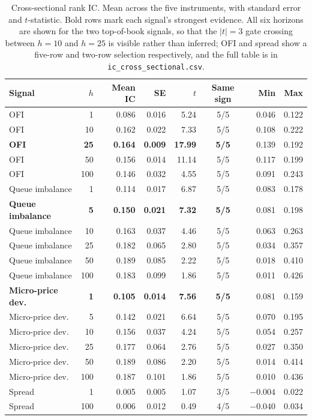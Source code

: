 \documentclass[11pt]{scrartcl}
\begin{document}
\begin{table}[H]
\centering
\caption{Cross-sectional rank IC. Mean across the five instruments, with standard error and $t$-statistic. Bold rows mark each signal's strongest evidence. All six horizons are shown for the two top-of-book signals, so that the $|t| = 3$ gate crossing between $h=10$ and $h=25$ is visible rather than inferred; OFI and spread show a five-row and two-row selection respectively, and the full table is in \texttt{ic\_cross\_sectional.csv}.}
\label{tab:cross}
\begin{tabular}{lrrrrcrr}
\toprule
Signal & $h$ & Mean IC & SE & $t$ & Same sign & Min & Max \\
\midrule
OFI & 1   & 0.086 & 0.016 & 5.24 & 5/5 & 0.046 & 0.122 \\
OFI & 10  & 0.162 & 0.022 & 7.33 & 5/5 & 0.108 & 0.222 \\
\textbf{OFI} & \textbf{25} & \textbf{0.164} & \textbf{0.009} & \textbf{17.99} & \textbf{5/5} & 0.139 & 0.192 \\
OFI & 50  & 0.156 & 0.014 & 11.14 & 5/5 & 0.117 & 0.199 \\
OFI & 100 & 0.146 & 0.032 & 4.55 & 5/5 & 0.091 & 0.243 \\
\midrule
Queue imbalance & 1 & 0.114 & 0.017 & 6.87 & 5/5 & 0.083 & 0.178 \\
\textbf{Queue imbalance} & \textbf{5} & \textbf{0.150} & \textbf{0.021} & \textbf{7.32} & \textbf{5/5} & 0.081 & 0.198 \\
Queue imbalance & 10  & 0.163 & 0.037 & 4.46 & 5/5 & 0.063 & 0.263 \\
Queue imbalance & 25  & 0.182 & 0.065 & 2.80 & 5/5 & 0.034 & 0.357 \\
Queue imbalance & 50  & 0.189 & 0.085 & 2.22 & 5/5 & 0.018 & 0.410 \\
Queue imbalance & 100 & 0.183 & 0.099 & 1.86 & 5/5 & 0.011 & 0.426 \\
\midrule
\textbf{Micro-price dev.} & \textbf{1} & \textbf{0.105} & \textbf{0.014} & \textbf{7.56} & \textbf{5/5} & 0.081 & 0.159 \\
Micro-price dev. & 5   & 0.142 & 0.021 & 6.64 & 5/5 & 0.070 & 0.195 \\
Micro-price dev. & 10  & 0.156 & 0.037 & 4.24 & 5/5 & 0.054 & 0.257 \\
Micro-price dev. & 25  & 0.177 & 0.064 & 2.76 & 5/5 & 0.027 & 0.350 \\
Micro-price dev. & 50  & 0.189 & 0.086 & 2.20 & 5/5 & 0.014 & 0.414 \\
Micro-price dev. & 100 & 0.187 & 0.101 & 1.86 & 5/5 & 0.010 & 0.436 \\
\midrule
Spread & 1   & 0.005 & 0.005 & 1.07 & 3/5 & $-0.004$ & 0.022 \\
Spread & 100 & 0.006 & 0.012 & 0.49 & 4/5 & $-0.040$ & 0.034 \\
\bottomrule
\end{tabular}
\end{table}
\end{document}
